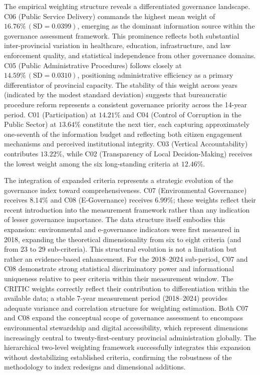 \documentclass[12pt,a4paper]{article}
\begin{document}
The empirical weighting structure reveals a differentiated governance landscape. C06 (Public Service Delivery) commands the highest mean weight of $16.76\%\,(\mathrm{SD} = 0.0399)$, emerging as the dominant information source within the governance assessment framework. This prominence reflects both substantial inter-provincial variation in healthcare, education, infrastructure, and law enforcement quality, and statistical independence from other governance domains. C05 (Public Administrative Procedures) follows closely at $14.59\%\,(\mathrm{SD} = 0.0310)$, positioning administrative efficiency as a primary differentiator of provincial capacity. The stability of this weight across years (indicated by the modest standard deviation) suggests that bureaucratic procedure reform represents a consistent governance priority across the 14-year period. C01 (Participation) at $14.21\%$ and C04 (Control of Corruption in the Public Sector) at $13.64\%$ constitute the next tier, each capturing approximately one-seventh of the information budget and reflecting both citizen engagement mechanisms and perceived institutional integrity. C03 (Vertical Accountability) contributes $13.22\%$, while C02 (Transparency of Local Decision-Making) receives the lowest weight among the six long-standing criteria at $12.46\%$.

The integration of expanded criteria represents a strategic evolution of the governance index toward comprehensiveness. C07 (Environmental Governance) receives $8.14\%$ and C08 (E-Governance) receives $6.99\%$; these weights reflect their recent introduction into the measurement framework rather than any indication of lesser governance importance. The data structure itself embodies this expansion: environmental and e-governance indicators were first measured in 2018, expanding the theoretical dimensionality from six to eight criteria (and from 23 to 29 sub-criteria). This structural evolution is not a limitation but rather an evidence-based enhancement. For the 2018--2024 sub-period, C07 and C08 demonstrate strong statistical discriminatory power and informational uniqueness relative to peer criteria within their measurement window. The CRITIC weights correctly reflect their contribution to differentiation within the available data; a stable 7-year measurement period (2018--2024) provides adequate variance and correlation structure for weighting estimation. Both C07 and C08 expand the conceptual scope of governance assessment to encompass environmental stewardship and digital accessibility, which represent dimensions increasingly central to twenty-first-century provincial administration globally. The hierarchical two-level weighting framework successfully integrates this expansion without destabilizing established criteria, confirming the robustness of the methodology to index redesigns and dimensional additions.
\end{document}
